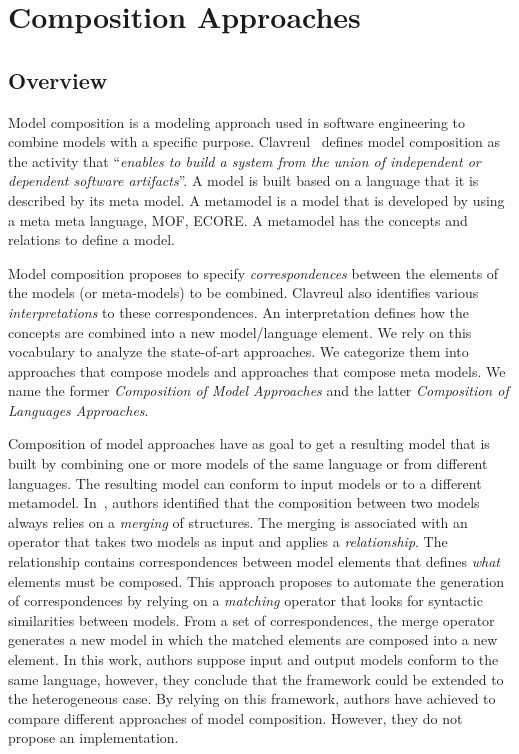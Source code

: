 \section{Composition Approaches}
\subsection{Overview}
Model composition is a modeling approach used in software engineering to combine models with a specific purpose. Clavreul~\cite{clavreulmodelcompo} defines model composition as the activity that ``\textit{enables to build a system from the union of independent or dependent software artifacts}''. A model is built based on a language that it is described by its meta model. A metamodel is a model that is developed by using a meta meta language, \eg MOF, ECORE. A metamodel has the concepts and relations to define a model.

Model composition proposes to specify \emph{correspondences} between the elements of the models (or meta-models) to be combined. Clavreul also identifies various \emph{interpretations} to these correspondences. An interpretation defines how the concepts are combined into a new model/language element. We rely on this vocabulary to analyze the state-of-art approaches. We categorize them into approaches that compose models and approaches that compose meta models. We name the former \emph{Composition of Model Approaches} and the latter \emph{Composition of Languages Approaches}.    

Composition of model approaches have as goal to get a resulting model that is built by combining one or more models of the same language or from different languages. The resulting model can conform to input models or to a different metamodel. In~\cite{mergemanifest}, authors identified that the composition between two models always relies on a \emph{merging} of structures. The merging is associated with an operator that takes two models as input and applies a \emph{relationship}. The relationship contains correspondences between model elements that defines \emph{what} elements must be composed. This approach proposes to automate the generation of correspondences by relying on a \emph{matching} operator that looks for syntactic similarities between models. From a set of correspondences, the merge operator generates a new model in which the matched elements are composed into a new element. In this work, authors suppose input and output models conform to the same language, however, they conclude that the framework could be extended to the heterogeneous case. By relying on this framework, authors have achieved to compare different approaches of model composition. However, they do not propose an implementation. 

